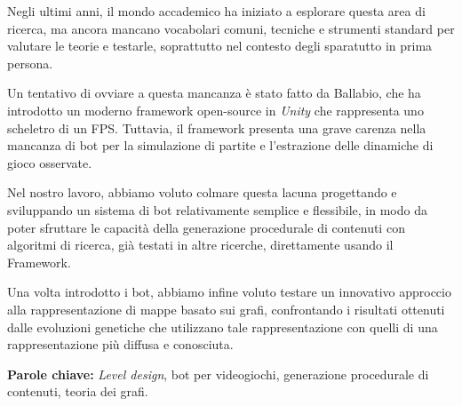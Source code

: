 \documentclass{Configuration_Files/PoliMi3i_thesis}
\begin{document}
Negli ultimi anni, il mondo accademico ha iniziato a esplorare questa area di ricerca, ma ancora mancano vocabolari comuni, tecniche e strumenti standard per valutare le teorie e testarle, soprattutto nel contesto degli sparatutto in prima persona.

Un tentativo di ovviare a questa mancanza è stato fatto da Ballabio, che ha introdotto un moderno framework open-source in \textit{Unity} che rappresenta uno scheletro di un FPS. Tuttavia, il framework presenta una grave carenza nella mancanza di bot per la simulazione di partite e l'estrazione delle dinamiche di gioco osservate.

Nel nostro lavoro, abbiamo voluto colmare questa lacuna progettando e sviluppando un sistema di bot relativamente semplice e flessibile, in modo da poter sfruttare le capacità della generazione procedurale di contenuti con algoritmi di ricerca, già testati in altre ricerche, direttamente usando il Framework.

Una volta introdotto i bot, abbiamo infine voluto testare un innovativo approccio alla rappresentazione di mappe basato sui grafi, confrontando i risultati ottenuti dalle evoluzioni genetiche che utilizzano tale rappresentazione con quelli di una rappresentazione più diffusa e conosciuta.

\textbf{Parole chiave:} \textit{Level design}, bot per videogiochi, generazione procedurale di contenuti, teoria dei grafi.   %


\thispagestyle{empty}
\tableofcontents %
\thispagestyle{empty}
\cleardoublepage

\listoffigures





\mainmatter %
\end{document}
